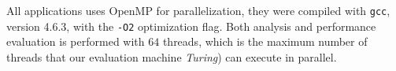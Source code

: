 %

%





All applications uses OpenMP for parallelization, they  were compiled with
\texttt{gcc}, version 4.6.3, with the \texttt{-O2} optimization flag.  Both
analysis and performance evaluation is performed with $64$ threads,
which is the maximum number of threads that our evaluation machine
\emph{Turing}) can execute in parallel.

